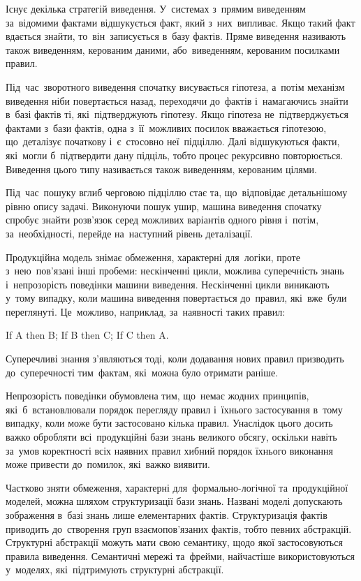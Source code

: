 \documentclass[
  a4paper,
  oneside,
  BCOR = 10mm,
  DIV = 12,
  12pt,
  headings = normal,
]{scrartcl}
\begin{document}
        Існує декілька стратегій виведення. У~системах з~прямим виведенням за~відомими фактами відшукується факт, який з~них~випливає. Якщо такий факт вдається знайти, то~він~записується в~базу фактів. Пряме виведення називають також виведенням, керованим даними, або~виведенням, керованим посилками правил.

        Під~час~зворотного виведення спочатку висувається гіпотеза, а~потім механізм виведення ніби повертається назад, переходячи до~фактів і~намагаючись знайти в~базі фактів ті, які~підтверджують гіпотезу. Якщо гіпотеза не~підтверджується фактами з~бази фактів, одна з~її~можливих посилок вважається гіпотезою, що~деталізує початкову і~є~стосовно неї~підціллю. Далі відшукуються факти, які~могли б~підтвердити дану підціль, тобто процес рекурсивно повторюється. Виведення цього типу називається також виведенням, керованим цілями.

        Під~час~пошуку вглиб черговою підціллю стає та, що~відповідає детальнішому рівню опису задачі. Виконуючи пошук ушир, машина виведення спочатку спробує знайти розв'язок серед можливих варіантів одного рівня і~потім, за~необхідності, перейде на~наступний рівень деталізації.

        Продукційна модель знімає обмеження, характерні для~логіки, проте з~нею~пов'язані інші пробеми: нескінченні цикли, можлива суперечність знань і~непрозорість поведінки машини виведення.
        Нескінченні цикли виникають у~тому випадку, коли машина виведення повертається до~правил, які~вже~були переглянуті. Це~можливо, наприклад, за~наявності таких правил:
        \begin{codegeneric}
          If A then B; If B then C; If C then A.
        \end{codegeneric}

        Суперечливі знання з'являються тоді, коли додавання нових правил призводить до~суперечності тим~фактам, які~можна було отримати раніше.

        Непрозорість поведінки обумовлена тим, що~немає жодних принципів, які~б~встановлювали порядок перегляду правил і~їхнього застосування в~тому випадку, коли може бути застосовано кілька правил. Унаслідок цього досить важко обробляти всі~продукційні бази знань великого обсягу, оскільки навіть за~умов коректності всіх наявних правил хибний порядок їхнього виконання може привести до~помилок, які~важко виявити.

        Частково зняти обмеження, характерні для~формально-логічної та~продукційної моделей, можна шляхом структуризації бази знань. Названі моделі допускають зображення в~базі знань лише елементарних фактів. Структуризація фактів приводить до~створення груп взаємопов'язаних фактів, тобто певних абстракцій. Структурні абстракції можуть мати свою семантику, щодо якої застосовуються правила виведення. Семантичні мережі та~фрейми, найчастіше використовуються у~моделях, які~підтримують структурні абстракції.
\end{document}
